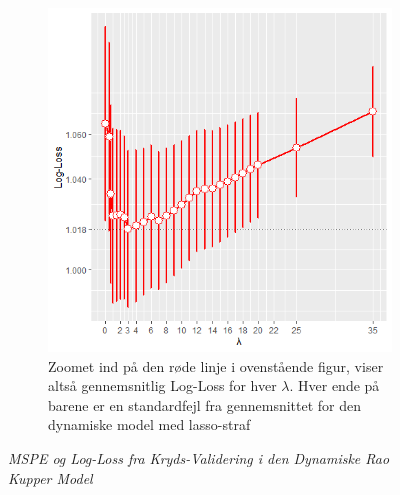\documentclass[11pt,a4paper]{article}
\begin{document}
\begin{figure}[h!]
\begin{subfigure}[b]{0.425\linewidth}
    \includegraphics[width=\textwidth]{BARPLOTLOGALPHANY.png}
    \caption{Zoomet ind på den røde linje i ovenstående figur, viser altså gennemsnitlig Log-Loss for hver $\lambda$. Hver ende på barene er en standardfejl fra gennemsnittet for den dynamiske model med lasso-straf}
    \label{fig:LogLossBarDyn}    
    \end{subfigure}
\caption{\textit{MSPE og Log-Loss fra Kryds-Validering i den Dynamiske Rao Kupper Model}}
  \label{fig:MSPELOGLOSDYN}
\end{figure}
\end{document}
